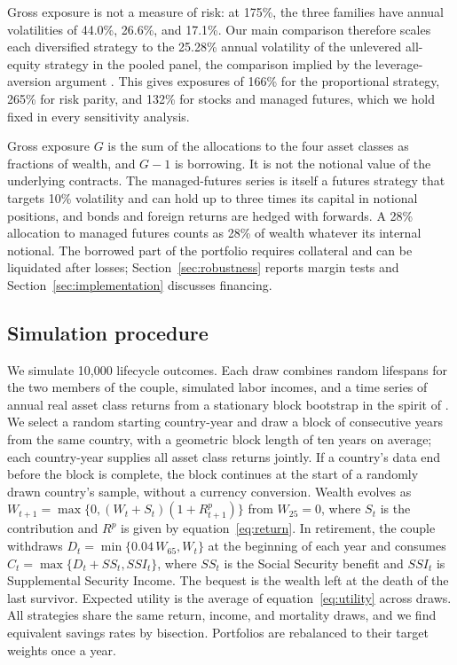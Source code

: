 \documentclass[12pt]{article}
\begin{document}
Gross exposure is not a measure of risk: at 175\%, the three families have annual volatilities of 44.0\%,
26.6\%, and 17.1\%. Our main comparison therefore scales each diversified strategy to the 25.28\% annual
volatility of the unlevered all-equity strategy in the pooled panel, the comparison implied by the
leverage-aversion argument \citep{Asness2024}. This gives exposures of 166\% for the proportional strategy,
265\% for risk parity, and 132\% for stocks and managed futures, which we hold fixed in every sensitivity
analysis.

Gross exposure $G$ is the sum of the allocations to the four asset classes as fractions of wealth, and
$G-1$ is borrowing. It is not the notional value of the underlying contracts. The managed-futures series is
itself a futures strategy that targets 10\% volatility and can hold up to three times its capital in
notional positions, and bonds and foreign returns are hedged with forwards. A 28\% allocation to managed
futures counts as 28\% of wealth whatever its internal notional. The borrowed part of the portfolio
requires collateral and can be liquidated after losses; Section~\ref{sec:robustness} reports margin tests
and Section~\ref{sec:implementation} discusses financing.

\subsection{Simulation procedure}
\label{sec:simulation}\label{sec:bootstrap}

We simulate 10,000 lifecycle outcomes. Each draw combines random lifespans for the two members of the
couple, simulated labor incomes, and a time series of annual real asset class returns from a stationary
block bootstrap in the spirit of \citet{PolitisRomano1994}. We select a random starting country-year and
draw a block of consecutive years from the same country, with a geometric block length of ten years on
average; each country-year supplies all asset class returns jointly. If a country's data end before the
block is complete, the block continues at the start of a randomly drawn country's sample, without a
currency conversion. Wealth evolves as $W_{t+1}=\max\{0,(W_t+S_t)(1+R^p_{t+1})\}$ from $W_{25}=0$, where
$S_t$ is the contribution and $R^p$ is given by equation~\eqref{eq:return}. In retirement, the couple
withdraws $D_t=\min\{0.04\,W_{65},W_t\}$ at the beginning of each year and consumes
$C_t=\max\{D_t+SS_t,SSI_t\}$, where $SS_t$ is the Social Security benefit and $SSI_t$ is Supplemental
Security Income. The bequest is the wealth left at the death of the last survivor. Expected utility is the
average of equation~\eqref{eq:utility} across draws. All strategies share the same return, income, and
mortality draws, and we find equivalent savings rates by bisection. Portfolios are rebalanced to their
target weights once a year.
\end{document}
